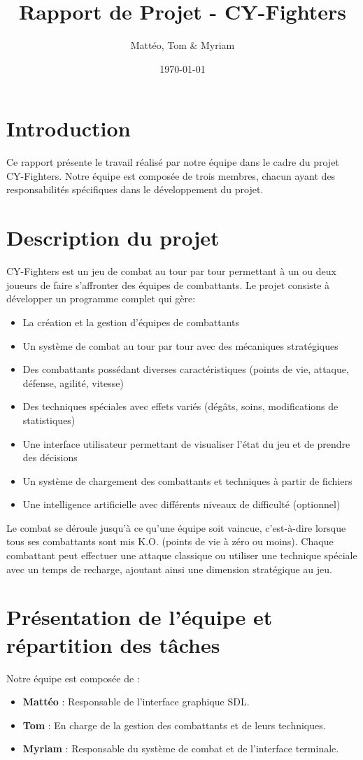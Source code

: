 \documentclass[12pt,a4paper]{article}
\title{Rapport de Projet - CY-Fighters}
\date{\today}
\author{Mattéo, Tom \& Myriam}
\begin{document}
\maketitle

\section{Introduction}
Ce rapport présente le travail réalisé par notre équipe dans le cadre du projet CY-Fighters. Notre équipe est composée de trois membres, chacun ayant des responsabilités spécifiques dans le développement du projet.

\section{Description du projet}
CY-Fighters est un jeu de combat au tour par tour permettant à un ou deux joueurs de faire s'affronter des équipes de combattants. Le projet consiste à développer un programme complet qui gère:

\begin{itemize}
    \item La création et la gestion d'équipes de combattants
    \item Un système de combat au tour par tour avec des mécaniques stratégiques
    \item Des combattants possédant diverses caractéristiques (points de vie, attaque, défense, agilité, vitesse)
    \item Des techniques spéciales avec effets variés (dégâts, soins, modifications de statistiques)
    \item Une interface utilisateur permettant de visualiser l'état du jeu et de prendre des décisions
    \item Un système de chargement des combattants et techniques à partir de fichiers
    \item Une intelligence artificielle avec différents niveaux de difficulté (optionnel)
\end{itemize}

Le combat se déroule jusqu'à ce qu'une équipe soit vaincue, c'est-à-dire lorsque tous ses combattants sont mis K.O. (points de vie à zéro ou moins). Chaque combattant peut effectuer une attaque classique ou utiliser une technique spéciale avec un temps de recharge, ajoutant ainsi une dimension stratégique au jeu.

\section{Présentation de l'équipe et répartition des tâches}
Notre équipe est composée de :
\begin{itemize}
    \item \textbf{Mattéo} : Responsable de l'interface graphique SDL.
    \item \textbf{Tom} : En charge de la gestion des combattants et de leurs techniques.
    \item \textbf{Myriam} : Responsable du système de combat et de l'interface terminale.
\end{itemize}
\end{document}
